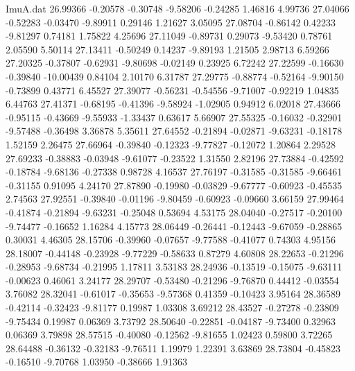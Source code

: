 \begin{filecontents}{ImuA.dat}
  26.99366   -0.20578   -0.30748   -9.58206   -0.24285    1.46816    4.99736
  27.04066   -0.52283   -0.03470   -9.89911    0.29146    1.21627    3.05095
  27.08704   -0.86142    0.42233   -9.81297    0.74181    1.75822    4.25696
  27.11049   -0.89731    0.29073   -9.53420    0.78761    2.05590    5.50114
  27.13411   -0.50249    0.14237   -9.89193    1.21505    2.98713    6.59266
  27.20325   -0.37807   -0.62931   -9.80698   -0.02149    0.23925    6.72242
  27.22599   -0.16630   -0.39840  -10.00439    0.84104    2.10170    6.31787
  27.29775   -0.88774   -0.52164   -9.90150   -0.73899    0.43771    6.45527
  27.39077   -0.56231   -0.54556   -9.71007   -0.92219    1.04835    6.44763
  27.41371   -0.68195   -0.41396   -9.58924   -1.02905    0.94912    6.02018
  27.43666   -0.95115   -0.43669   -9.55933   -1.33437    0.63617    5.66907
  27.55325   -0.16032   -0.32901   -9.57488   -0.36498    3.36878    5.35611
  27.64552   -0.21894   -0.02871   -9.63231   -0.18178    1.52159    2.26475
  27.66964   -0.39840   -0.12323   -9.77827   -0.12072    1.20864    2.29528
  27.69233   -0.38883   -0.03948   -9.61077   -0.23522    1.31550    2.82196
  27.73884   -0.42592   -0.18784   -9.68136   -0.27338    0.98728    4.16537
  27.76197   -0.31585   -0.31585   -9.66461   -0.31155    0.91095    4.24170
  27.87890   -0.19980   -0.03829   -9.67777   -0.60923   -0.45535    2.74563
  27.92551   -0.39840   -0.01196   -9.80459   -0.60923   -0.09660    3.66159
  27.99464   -0.41874   -0.21894   -9.63231   -0.25048    0.53694    4.53175
  28.04040   -0.27517   -0.20100   -9.74477   -0.16652    1.16284    4.15773
  28.06449   -0.26441   -0.12443   -9.67059   -0.28865    0.30031    4.46305
  28.15706   -0.39960   -0.07657   -9.77588   -0.41077    0.74303    4.95156
  28.18007   -0.44148   -0.23928   -9.77229   -0.58633    0.87279    4.60808
  28.22653   -0.21296   -0.28953   -9.68734   -0.21995    1.17811    3.53183
  28.24936   -0.13519   -0.15075   -9.63111   -0.00623    0.46061    3.24177
  28.29707   -0.53480   -0.21296   -9.76870    0.44412   -0.03554    3.76082
  28.32041   -0.61017   -0.35653   -9.57368    0.41359   -0.10423    3.95164
  28.36589   -0.42114   -0.32423   -9.81177    0.19987    1.03308    3.69212
  28.43527   -0.27278   -0.23809   -9.75434    0.19987    0.06369    3.73792
  28.50640   -0.22851   -0.04187   -9.73400    0.32963    0.06369    3.79898
  28.57515   -0.40080   -0.12562   -9.81655    1.02423    0.59800    3.72265
  28.64488   -0.36132   -0.32183   -9.76511    1.19979    1.22391    3.63869
  28.73804   -0.45823   -0.16510   -9.70768    1.03950   -0.38666    1.91363

\end{filecontents}

